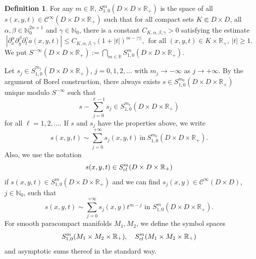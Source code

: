 \documentclass[12pt]{amsart}
\theoremstyle{definition}
\newtheorem{definition}[theorem]{Definition}
\theoremstyle{named}
\numberwithin{equation}{subsection}
\newcommand{\N}{\mathbb{N}}
\def\cC{\mathscr{C}}
\begin{document}
	\begin{definition}\label{d-gue241119ycdp}
		For any $m\in\mathbb R$, $S^m_{1,0}(D\times D\times\mathbb{R}_+)$ 
		is the space of all $s(x,y,t)\in\cC^\infty(D\times D\times\mathbb{R}_+)$ 
		such that for all compact sets $K\Subset D\times D$, all $\alpha, 
		\beta\in\N^{2n+1}_0$ and $\gamma\in\N_0$, 
		there is a constant $C_{K,\alpha,\beta,\gamma}>0$ satisfying the estimate
		\begin{equation}
		\left|\partial^\alpha_x\partial^\beta_y\partial^\gamma_t a(x,y,t)\right|\leq 
		C_{K,\alpha,\beta,\gamma}(1+|t|)^{m-|\gamma|},\ \ 
		\mbox{for all $(x,y,t)\in K\times\mathbb R_+$, $|t|\geq1$}.
		\end{equation}
		We put $S^{-\infty}(D\times D\times\mathbb{R}_+)
		:=\bigcap_{m\in\mathbb R}S^m_{1,0}(D\times D\times\mathbb{R}_+)$.
	\end{definition}
	Let $s_j\in S^{m_j}_{1,0}(D\times D\times\mathbb{R}_+)$, 
	$j=0,1,2,\ldots$ with $m_j\rightarrow-\infty$ as $j\rightarrow+\infty$. 
	By the argument of Borel construction, there always exists $s\in S^{m_0}_{1,0}(D\times D\times\mathbb{R}_+)$ 
	unique modulo $S^{-\infty}$ such that 
	\begin{equation}
	s-\sum^{\ell-1}_{j=0}s_j\in S^{m_\ell}_{1,0}(D\times D\times\mathbb{R}_+)
	\end{equation}
	for all $\ell=1,2,\ldots$. If $s$ and $s_j$ have the properties above, we write
	\begin{equation}
	s(x,y,t)\sim\sum^{+\infty}_{j=0}s_j(x,y,t)~\text{in}~ 
	S^{m_0}_{1,0}(D\times D\times\mathbb{R}_+).
	\end{equation}
	Also, we use the notation 
	\begin{equation}  
	s(x, y, t)\in S^{m}_{{\rm cl\,}}(D\times D\times\mathbb{R}_+)
	\end{equation}
	if $s(x, y, t)\in S^{m}_{1,0}(D\times D\times\mathbb{R}_+)$ and we can find $s_j(x, y)\in\cC^\infty(D\times D)$, $j\in\N_0$, such that 
	\begin{equation}
	s(x, y, t)\sim\sum^{+\infty}_{j=0}s_j(x, y)t^{m-j}\text{ in }S^{m}_{1, 0}
	(D\times D\times\mathbb{R}_+).
	\end{equation}
For smooth paracompact manifolds $M_1, M_2$,
we define the symbol spaces 
$$S^m_{{1,0}}(M_1\times M_2\times\mathbb R_+),
\quad S^m_{{\rm cl\,}}(M_1\times M_2\times\mathbb R_+)$$ 
and asymptotic sums thereof in the standard way.
\end{document}
